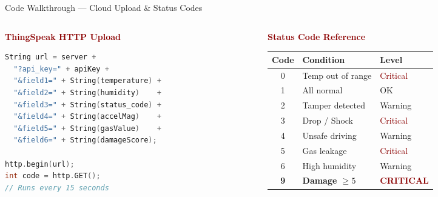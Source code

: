 \documentclass[aspectratio=169, 10pt]{beamer}
\begin{document}
\begin{frame}[fragile,shrink=3]{Code Walkthrough --- Cloud Upload \& Status Codes}
  \begin{columns}[T]
    \begin{column}{0.5\textwidth}
      \textbf{\textcolor{darkred}{ThingSpeak HTTP Upload}}
      \begin{lstlisting}[language=C++]
String url = server +
  "?api_key=" + apiKey +
  "&field1=" + String(temperature) +
  "&field2=" + String(humidity)    +
  "&field3=" + String(status_code) +
  "&field4=" + String(accelMag)    +
  "&field5=" + String(gasValue)    +
  "&field6=" + String(damageScore);

http.begin(url);
int code = http.GET();
// Runs every 15 seconds
      \end{lstlisting}
    \end{column}
    \begin{column}{0.5\textwidth}
      \textbf{\textcolor{darkred}{Status Code Reference}}
      \vspace{0.2em}
      {\small
      \begin{tabular}{@{}cll@{}}
        \toprule
        \textbf{Code} & \textbf{Condition} & \textbf{Level} \\
        \midrule
        0 & Temp out of range  & \textcolor{darkred}{Critical} \\
        1 & All normal         & \textcolor{codegreen}{OK} \\
        2 & Tamper detected    & \textcolor{codeyellow}{Warning} \\
        3 & Drop / Shock       & \textcolor{darkred}{Critical} \\
        4 & Unsafe driving     & \textcolor{codeyellow}{Warning} \\
        5 & Gas leakage        & \textcolor{darkred}{Critical} \\
        6 & High humidity      & \textcolor{codeyellow}{Warning} \\
        \textbf{9} & \textbf{Damage $\geq5$} & \textcolor{darkred}{\textbf{CRITICAL}} \\
        \bottomrule
      \end{tabular}
      }
    \end{column}
  \end{columns}
\end{frame}
\end{document}
